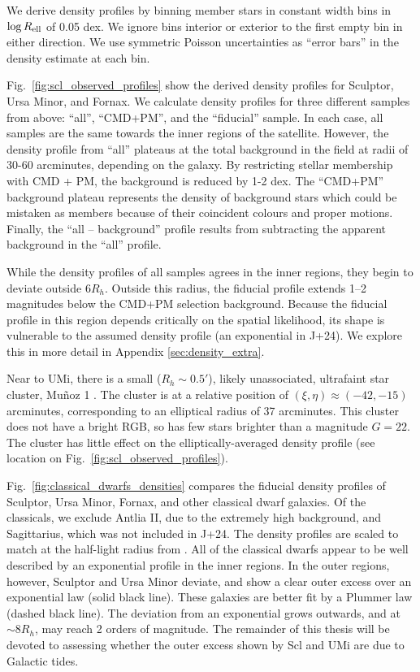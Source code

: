 We derive density profiles by binning member stars in constant width
bins in \(\log R_{\rm ell}\) of 0.05 dex. We ignore bins interior or
exterior to the first empty bin in either direction. We use symmetric
Poisson uncertainties as ``error bars'' in the density estimate at each
bin.

Fig.~\ref{fig:scl_observed_profiles} show the derived density profiles
for Sculptor, Ursa Minor, and Fornax. We calculate density profiles for
three different samples from above: ``all'', ``CMD+PM'', and the
``fiducial'' sample. In each case, all samples are the same towards the
inner regions of the satellite. However, the density profile from
``all'' plateaus at the total background in the field at radii of 30-60
arcminutes, depending on the galaxy. By restricting stellar membership
with CMD + PM, the background is reduced by 1-2 dex. The ``CMD+PM''
background plateau represents the density of background stars which
could be mistaken as members because of their coincident colours and
proper motions. Finally, the ``all -- background'' profile results from
subtracting the apparent background in the ``all'' profile.

While the density profiles of all samples agrees in the inner regions,
they begin to deviate outside \(6 R_h\). Outside this radius, the
fiducial profile extends 1--2 magnitudes below the CMD+PM selection
background. Because the fiducial profile in this region depends
critically on the spatial likelihood, its shape is vulnerable to the
assumed density profile (an exponential in J+24). We explore this in
more detail in Appendix \ref{sec:density_extra}.

Near to UMi, there is a small (\(R_h\sim 0.5'\)), likely unassociated,
ultrafaint star cluster, Muñoz 1 \citep{munoz+2012}. The cluster is at a
relative position of \((\xi, \eta) \approx(-42, -15)\) arcminutes,
corresponding to an elliptical radius of 37 arcminutes. This cluster
does not have a bright RGB, so has few stars brighter than a magnitude
\(G=22\). The cluster has little effect on the elliptically-averaged
density profile (see location on Fig.~\ref{fig:scl_observed_profiles}).

Fig.~\ref{fig:classical_dwarfs_densities} compares the fiducial density
profiles of Sculptor, Ursa Minor, Fornax, and other classical dwarf
galaxies. Of the classicals, we exclude Antlia II, due to the extremely
high background, and Sagittarius, which was not included in J+24. The
density profiles are scaled to match at the half-light radius from
\citet{munoz+2018}. All of the classical dwarfs appear to be well
described by an exponential profile in the inner regions. In the outer
regions, however, Sculptor and Ursa Minor deviate, and show a clear
outer excess over an exponential law (solid black line). These galaxies
are better fit by a Plummer law (dashed black line). The deviation from
an exponential grows outwards, and at \(\sim 8 R_h\), may reach 2 orders
of magnitude. The remainder of this thesis will be devoted to assessing
whether the outer excess shown by Scl and UMi are due to Galactic tides.

